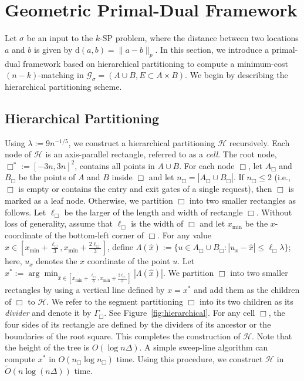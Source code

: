 \documentclass[11pt,onecolumn]{article}
\def\mcG{{\mathcal{G}}}
\def\mcH{{\mathcal{H}}}
\newcommand{\cell}{\Box}
\newcommand{\distance}[2]{\mathrm{d}(#1, #2)}
\newcommand{\divider}[1]{\Gamma_{#1}}
\begin{document}
\section{Geometric Primal-Dual Framework}\label{sec:geo-primal-dual}

Let $\sigma$ be an input to the $k$-SP problem, where the distance between two locations $a$ and $b$ is given by $\distance{a}{b}=\|a-b\|_p$. In this section, we introduce a primal-dual framework based on hierarchical partitioning to compute a minimum-cost $(n-k)$-matching in $\mcG_\sigma=(A\cup B, E\subset A\times B)$. We begin by describing the hierarchical partitioning scheme.

%


\subsection{Hierarchical Partitioning}\label{sec:hierarchical}
Using $\lambda:=9n^{-1/5}$, we construct a hierarchical partitioning $\mcH$ recursively. Each node of $\mcH$ is an axis-parallel rectangle, referred to as a \emph{cell}. The root node, $\cell^*:=[-3n, 3n]^2$, contains all points in $A\cup B$. For each node $\cell$, let $A_\cell$ and $B_\cell$ be the points of $A$ and $B$ inside $\cell$ and let $n_{\cell}=|A_\cell \cup B_{\cell}|$. If $n_{\cell}\le2$ (i.e., $\cell$ is empty or contains the entry and exit gates of a single request), then $\cell$ is marked as a leaf node. Otherwise, we partition $\cell$ into two smaller rectangles as follows. Let $\ell_\cell$ be the larger of the length and width of rectangle $\cell$. Without loss of generality, assume that $\ell_\cell$ is the width of $\cell$ and let $x_{\min}$ be the $x$-coordinate of the bottom-left corner of $\cell$.   For any value $\hat{x}\in [x_{\min}+\frac{\ell_\cell}{3}, x_{\min}+\frac{2\ell_\cell}{3}]$, define $\Lambda(\hat{x}):=\{u\in A_\cell\cup B_\cell: |u_x-\hat{x}|\le \ell_\cell\lambda\}$; here, $u_x$ denotes the $x$ coordinate of the point $u$. Let $x^*:=\arg\min_{\hat{x}\in [x_{\min}+\frac{\ell_\cell}{3}, x_{\min}+\frac{2\ell_\cell}{3}]}|\Lambda(\hat{x})|$. 
We partition $\cell$ into two smaller rectangles by using a vertical line defined by $x=x^*$ and add them as the children of $\cell$ to $\mcH$. We refer to the segment partitioning $\cell$ into its two children as its \emph{divider} and denote it by $\divider\cell$. See Figure~\ref{fig:hierarchical}. For any cell $\cell$, the four sides of its rectangle are defined by the dividers of its ancestor or the boundaries of the root square.
This completes the construction of $\mcH$. Note that the height of the tree is $O(\log n\Delta)$. A simple sweep-line algorithm can compute $x^*$ in $O(n_\cell\log n_\cell)$ time. Using this procedure, we construct $\mcH$ in $\tilde{O}(n \log (n\Delta))$ time.
\end{document}
